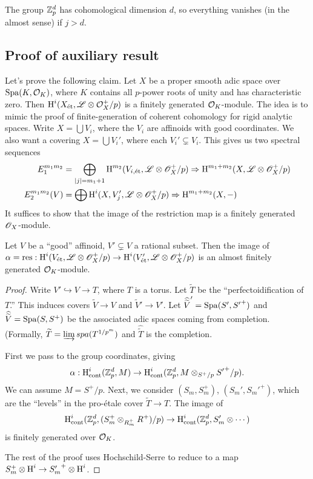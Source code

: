 The group $\mathbb{Z}_p^d$ has cohomological dimension $d$, so everything vanishes (in the 
almost sense) if $j>d$. 





\subsection{Proof of auxiliary result}

Let's prove the following claim. Let $X$ be a proper smooth adic space over 
$\operatorname{Spa}(K,\mathcal{O}_K)$, where $K$ contains all $p$-power roots of unity and has 
characteristic zero. Then $\operatorname{H}^i(X_{\textnormal{\'et}},\mathscr{L}\otimes \mathcal{O}_X^+/p)$ is a finitely generated 
$\mathcal{O}_K$-module. The idea is to mimic the proof of finite-generation of coherent 
cohomology for rigid analytic spaces. Write $X=\bigcup V_i$, where the $V_i$ are 
affinoids with good coordinates. We also want a covering $X=\bigcup V_i'$, where 
each $V_i'\subsetneq V_i$. This gives us two spectral sequences 
\begin{align*}
  E_1^{m_1 m_2} 
    &= \bigoplus_{|j|=m_1+1} \operatorname{H}^{m_2}(V_{i,\textnormal{\'et}},\mathscr{L}\otimes \mathscr{O}_X^+/p) \Rightarrow \operatorname{H}^{m_1+m_2}(X,\mathscr{L}\otimes \mathscr{O}_X^+/p)  \\
  E_2^{m_1 m_2}(V) 
    &= \bigoplus \operatorname{H}^i(X,V_j',\mathscr{L}\otimes \mathscr{O}_X^+/p) \Rightarrow \operatorname{H}^{m_1+m_2}(X,-)
\end{align*}
It suffices to show that the image of the restriction map is a finitely generated 
$\mathscr{O}_X$-module. 

\begin{lemma}
Let $V$ be a ``good'' affinoid, $V'\subsetneq V$ a rational subset. Then the image of 
$\alpha=\text{res}:\operatorname{H}^i(V_{\textnormal{\'et}},\mathscr{L}\otimes \mathscr{O}_X^+/p) \to \operatorname{H}^i(V_{\textnormal{\'et}}',\mathscr{L}\otimes \mathscr{O}_X^+/p)$ 
is an almost finitely generated $\mathcal{O}_K$-module. 
\end{lemma}
\begin{proof}
Write $V'\hookrightarrow V\to T$, where $T$ is a torus. Let $\widetilde T$ be the 
``perfectoidification of $T$.'' This induces covers $\widetilde V\to V$ and 
$\widetilde V' \to V'$. Let $\widehat{\widetilde V}'=\operatorname{Spa}(S',{S'}^+)$ and 
$\widehat{\widetilde V}=\operatorname{Spa}(S,S^+)$ be the associated adic spaces coming from 
completion. (Formally, $\widetilde T=\varinjlim spa(T^{1/p^m})$ and 
$\widehat{\widetilde T}$ is the completion. 

First we pass to the group coordinates, giving 
\[
  \alpha:\operatorname{H}_\text{cont}^i(\mathbb{Z}_p^d,M) \to \operatorname{H}_\text{cont}^i(\mathbb{Z}_p^d,M\otimes_{S^+/p} {S'}^+/p) .
\]
We can assume $M=S^+/p$. Next, we consider $(S_m,S_m^+)$, 
$(S_m',{S_m'}^+)$, which are the ``levels'' in the pro-\'etale cover 
$\widetilde T\to T$. The image of 
\[
  \operatorname{H}_\text{cont}^i(\mathbb{Z}_p^d,(S_m^+\otimes_{R_m^+}R^+)/p) \to \operatorname{H}_\text{cont}^i(\mathbb{Z}_p^d,S_m'\otimes \cdots)
\]
is finitely generated over $\mathcal{O}_K$. 

The rest of the proof uses Hochschild-Serre to reduce to a map 
$S_m^+\otimes \operatorname{H}^i \to {S_m'}^+\otimes \operatorname{H}^i$. 
\end{proof}


